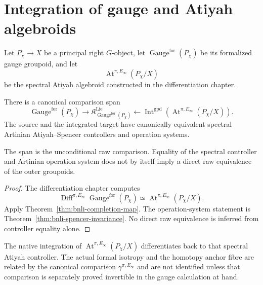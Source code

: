 \section{Integration of gauge and Atiyah algebroids}
\label{sec:bnli-gauge-integration}

Let \(P_\chi\to X\) be a principal right \(G\)-object, let
\(\operatorname{Gauge}^{\mathrm{for}}(P_\chi)\) be its formalized gauge
groupoid, and let
\[
    \operatorname{At}^{\pi,E_\infty}(P_\chi/X)
\]
be the spectral Atiyah algebroid constructed in the differentiation chapter.

\begin{theorem}
\label{thm:bnli-atiyah-integration}
There is a canonical comparison span
\[
\boxed{
    \operatorname{Gauge}^{\mathrm{for}}(P_\chi)
    \longrightarrow
    \mathfrak K^{\mathrm{Lie}}_{\operatorname{Gauge}^{\mathrm{for}}(P_\chi)}
    \longleftarrow
    \operatorname{Int}^{\mathrm{gpd}}
    \left(
      \operatorname{At}^{\pi,E_\infty}(P_\chi/X)
    \right).}
\]
The source and the integrated target have canonically equivalent spectral
Artinian Atiyah--Spencer controllers and operation systems.

The span is the unconditional raw comparison.  Equality of the spectral controller and Artinian operation system does not by itself imply a direct raw equivalence of the outer groupoids.
\end{theorem}

\begin{proof}
The differentiation chapter computes
\[
    \operatorname{Diff}^{\pi,E_\infty}
    \operatorname{Gauge}^{\mathrm{for}}(P_\chi)
    \simeq
    \operatorname{At}^{\pi,E_\infty}(P_\chi/X).
\]
Apply Theorem~\ref{thm:bnli-completion-map}.  The operation-system statement is
Theorem~\ref{thm:bnli-spencer-invariance}.  No direct raw equivalence is inferred from controller equality alone.
\end{proof}

\begin{corollary}
\label{cor:bnli-atiyah-sequence-integrates}
The native integration of
$\operatorname{At}^{\pi,E_\infty}(P_\chi/X)$ differentiates back to that
spectral Atiyah controller.  The actual formal isotropy and the homotopy anchor
fibre are related by the canonical comparison
$\gamma^{\pi,E_\infty}$ and are not identified unless that comparison is
separately proved invertible in the gauge calculation at hand.
\end{corollary}

